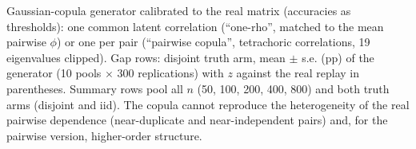 Gaussian-copula generator calibrated to the real matrix (accuracies as thresholds): one common latent correlation (``one-rho'', matched to the mean pairwise $\phi$) or one per pair (``pairwise copula'', tetrachoric correlations, 19 eigenvalues clipped). Gap rows: disjoint truth arm, mean $\pm$ s.e. (pp) of the generator (10 pools $\times$ 300 replications) with $z$ against the real replay in parentheses. Summary rows pool all $n$ (50, 100, 200, 400, 800) and both truth arms (disjoint and iid). The copula cannot reproduce the heterogeneity of the real pairwise dependence (near-duplicate and near-independent pairs) and, for the pairwise version, higher-order structure.
